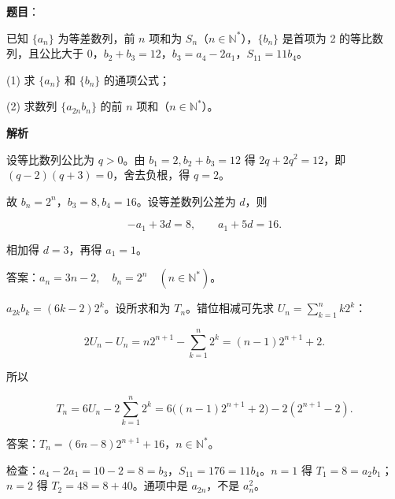 \begin{answer}

\textbf{题目}：

已知 $\{a_n\}$ 为等差数列，前 $n$ 项和为 $S_n$（$n\in\mathbb N^*$），$\{b_n\}$ 是首项为 2 的等比数列，且公比大于 0，$b_2+b_3=12$，$b_3=a_4-2a_1$，$S_{11}=11b_4$。

(1)   求 $\{a_n\}$ 和 $\{b_n\}$ 的通项公式；

(2)   求数列 $\{a_{2n}b_n\}$ 的前 $n$ 项和（$n\in\mathbb N^*$）。

\textbf{解析}


设等比数列公比为 $q>0$。由 $b_1=2,b_2+b_3=12$ 得 $2q+2q^2=12$，即 $(q-2)(q+3)=0$，舍去负根，得 $q=2$。

故 $b_n=2^n$，$b_3=8,b_4=16$。设等差数列公差为 $d$，则

\nopagebreak[4]
\[-a_1+3d=8,\qquad a_1+5d=16.\]

相加得 $d=3$，再得 $a_1=1$。

答案：$\boxed{a_n=3n-2,\quad b_n=2^n\quad(n\in\mathbb N^*)}$。


$a_{2k}b_k=(6k-2)2^k$。设所求和为 $T_n$。错位相减可先求 $U_n=\sum_{k=1}^n k2^k$：

\nopagebreak[4]
\[2U_n-U_n=n2^{n+1}-\sum_{k=1}^n2^k=(n-1)2^{n+1}+2.\]

所以

\nopagebreak[4]
\[T_n=6U_n-2\sum_{k=1}^n2^k=6\bigl((n-1)2^{n+1}+2\bigr)-2(2^{n+1}-2).\]

答案：$\boxed{T_n=(6n-8)2^{n+1}+16}$，$n\in\mathbb N^*$。

检查：$a_4-2a_1=10-2=8=b_3$，$S_{11}=176=11b_4$。$n=1$ 得 $T_1=8=a_2b_1$；$n=2$ 得 $T_2=48=8+40$。通项中是 $a_{2n}$，不是 $a_n^2$。



\end{answer}
